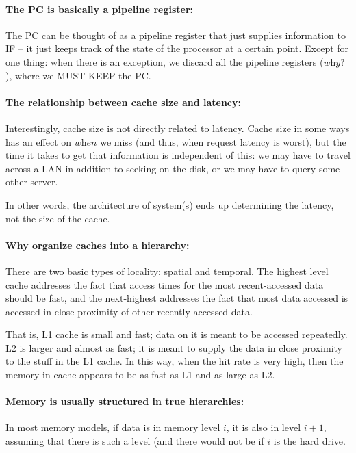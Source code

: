 \documentclass[a4paper]{article}
\begin{document}
\paragraph{The PC is basically a pipeline register: } The PC can be thought of as a pipeline register that just supplies information to IF -- it just keeps track of the state of the processor at a certain point. Except for one thing: when there is an exception, we discard all the pipeline registers ($\textit{why?}$), where we MUST KEEP the PC.

\paragraph{The relationship between cache size and latency: } Interestingly, cache size is not directly related to latency. Cache size in some ways has an effect on $\textit{when}$ we miss (and thus, when request latency is worst), but the time it takes to get that information is independent of this: we may have to travel across a LAN in addition to seeking on the disk, or we may have to query some other server.

In other words, the architecture of system(s) ends up determining the latency, not the size of the cache.

\paragraph{Why organize caches into a hierarchy: } There are two basic types of locality: spatial and temporal. The highest level cache addresses the fact that access times for the most recent-accessed data should be fast, and the next-highest addresses the fact that most data accessed is accessed in close proximity of other recently-accessed data.

That is, L1 cache is small and fast; data on it is meant to be accessed repeatedly. L2 is larger and almost as fast; it is meant to supply the data in close proximity to the stuff in the L1 cache. In this way, when the hit rate is very high, then the memory in cache appears to be as fast as L1 and as large as L2.

\paragraph{Memory is usually structured in true hierarchies: } In most memory models, if data is in memory level $i$, it is also in level $i+1$, assuming that there is such a level (and there would not be if $i$ is the hard drive.
\end{document}
